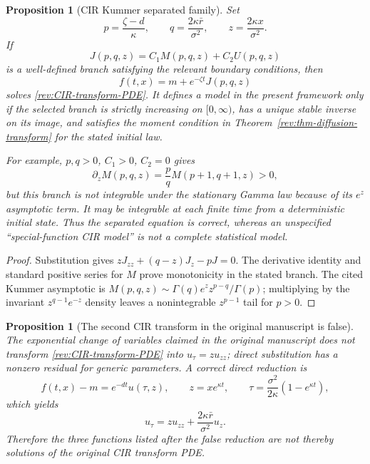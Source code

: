 \documentclass[11pt]{article}
\newtheorem{proposition}[definition]{Proposition}
\theoremstyle{remark}
\begin{document}
\begin{proposition}[CIR Kummer separated family]
\label{rev:prop-CIR-Kummer}
Set
\begin{equation}
p=\frac{\zeta-d}{\kappa},\qquad
q=\frac{2\kappa\bar r}{\sigma^2},\qquad
z=\frac{2\kappa x}{\sigma^2}.
\label{rev:CIR-Kummer-parameters}
\end{equation}
If
\begin{equation}
J(p,q,z)=C_1M(p,q,z)+C_2U(p,q,z)
\label{rev:CIR-Kummer-branch}
\end{equation}
is a well-defined branch satisfying the relevant boundary conditions, then
\begin{equation}
f(t,x)=m+e^{-\zeta t}J(p,q,z)
\label{rev:CIR-Kummer-transform}
\end{equation}
solves \eqref{rev:CIR-transform-PDE}.  It defines a model in the present
framework only if the selected branch is strictly increasing on $[0,\infty)$,
has a unique stable inverse on its image, and satisfies the moment condition in
Theorem~\ref{rev:thm-diffusion-transform} for the stated initial law.

For example, $p,q>0$, $C_1>0$, $C_2=0$ gives
\begin{equation}
\partial_zM(p,q,z)=\frac pqM(p+1,q+1,z)>0,
\label{rev:Kummer-M-derivative}
\end{equation}
but this branch is not integrable under the stationary Gamma law because of its
$e^z$ asymptotic term.  It may be integrable at each finite time from a
deterministic initial state.  Thus the separated equation is correct, whereas
an unspecified ``special-function CIR model'' is not a complete statistical
model.
\end{proposition}

\begin{proof}
Substitution gives
$zJ_{zz}+(q-z)J_z-pJ=0$.  The derivative identity and standard positive series
for $M$ prove monotonicity in the stated branch.  The cited Kummer asymptotic is
$M(p,q,z)\sim\Gamma(q)e^zz^{p-q}/\Gamma(p)$; multiplying by the invariant
$z^{q-1}e^{-z}$ density leaves a nonintegrable $z^{p-1}$ tail for $p>0$.
\end{proof}

\begin{proposition}[The second CIR transform in the original manuscript is false]
\label{rev:prop-CIR-false-transform}
The exponential change of variables claimed in the original manuscript does
not transform \eqref{rev:CIR-transform-PDE} into $u_\tau=zu_{zz}$; direct
substitution has a nonzero residual for generic parameters.  A correct direct
reduction is
\begin{equation}
f(t,x)-m=e^{-dt}u(\tau,z),\qquad
z=xe^{\kappa t},\qquad
\tau=\frac{\sigma^2}{2\kappa}(1-e^{\kappa t}),
\label{rev:CIR-correct-variables}
\end{equation}
which yields
\begin{equation}
u_\tau=zu_{zz}+\frac{2\kappa\bar r}{\sigma^2}u_z.
\label{rev:CIR-correct-reduction}
\end{equation}
Therefore the three functions listed after the false reduction are not thereby
solutions of the original CIR transform PDE.
\end{proposition}
\end{document}
